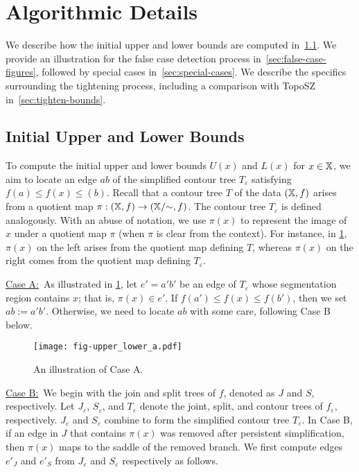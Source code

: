 \section{Algorithmic Details}
\label{sec:algorithm-details}

We describe how the initial upper and lower bounds are computed in~\cref{sec:set-bounds}. 
We provide an illustration for the false case detection process in~\cref{sec:false-case-figures}, followed by special cases in~\cref{sec:special-cases}. We describe the specifics surrounding the tightening process, including a comparison with TopoSZ in~\cref{sec:tighten-bounds}.

\subsection{Initial Upper and Lower Bounds}
\label{sec:set-bounds}

To compute the initial upper and lower bounds $U(x)$ and $L(x)$ for $x \in \mathbb{X}$, we aim to locate an edge $ab$ of the simplified contour tree $T_{\varepsilon}$ satisfying $f(a) \leq f(x) \leq (b)$. Recall that a contour tree $T$ of the data $(\mathbb{X},f)$ arises from a quotient map $\pi: (\mathbb{X}, f) \to (\mathbb{X}/{\sim}, f)$. The contour tree $T_{\varepsilon}$ is defined analogously. With an abuse of notation, we use $\pi(x)$ to represent the image of $x$ under a quotient map $\pi$ (when $\pi$ is clear from the context). For instance, in \cref{fig:upper-lower-a}, $\pi(x)$ on the left arises from the quotient map defining $T$, whereas $\pi(x)$ on the right comes from the quotient map defining $T_{\varepsilon}$.   

\underline{Case A:}~As illustrated in \cref{fig:upper-lower-a}, let $e'=a'b'$ be an edge of $T_{\varepsilon}$ whose segmentation region contains $x$; that is, $\pi(x) \in e'$.  
If $f(a') \leq f(x) \leq f(b')$, then we set $ab := a'b'$. Otherwise, we need to locate $ab$ with some care, following Case B below. 

\begin{figure}[!ht]
\centering
\texttt{[image: fig-upper\_lower\_a.pdf]}
\vspace{-2mm}
\caption{An illustration of Case A.}
\label{fig:upper-lower-a}
\vspace{-2mm}
\end{figure}

\underline{Case B:}~We begin with the join and split trees of $f$, denoted as $J$ and $S$, respectively. Let $J_\varepsilon$, $S_\varepsilon$, and $T_\varepsilon$ denote the joint, split, and contour  trees of $f_\varepsilon$, respectively. $J_{\varepsilon}$ and $S_{\varepsilon}$ combine to form the simplified contour tree $T_{\varepsilon}$. In Case B, if an edge in $J$ that contains $\pi(x)$ was removed after persistent simplification, then $\pi(x)$ maps to the saddle of the removed branch. We first compute edges $e'_J$ and $e'_S$ from $J_{\varepsilon}$ and $S_{\varepsilon}$ respectively as follows.    

